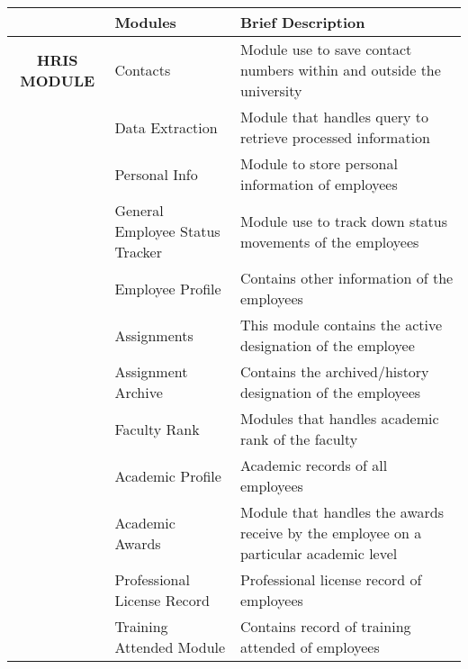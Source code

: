 \begin{table}[H]
\begin{tabular}{@{}cll@{}}
\toprule
\multicolumn{1}{l}{} & \textbf{Modules}                         & \textbf{Brief Description}                                                            \\ \midrule
\textbf{HRIS MODULE} & Contacts                                 & Module use to save contact numbers within and outside the university                  \\
                     & Data Extraction                          & Module that handles query to retrieve processed information                           \\
                     & Personal Info                            & Module to store personal information of employees                                     \\
                     & General Employee Status Tracker          & Module use to track down status movements of the employees                            \\
                     & Employee Profile                         & Contains other information of the employees                                           \\
                     & Assignments                              & This module contains the active designation of the employee                           \\
                     & Assignment Archive                       & Contains the archived/history designation of the employees                            \\
                     & Faculty Rank                             & Modules that handles academic rank of the faculty                                     \\
                     & Academic Profile                         & Academic records of all employees                                                     \\
                     & Academic Awards                          & Module that handles the awards receive by the employee on a particular academic level \\
                     & Professional License Record              & Professional license record of employees                                              \\
                     & Training Attended Module                 & Contains record of training attended of employees                                     \\

\end{tabular}
\end{table}
